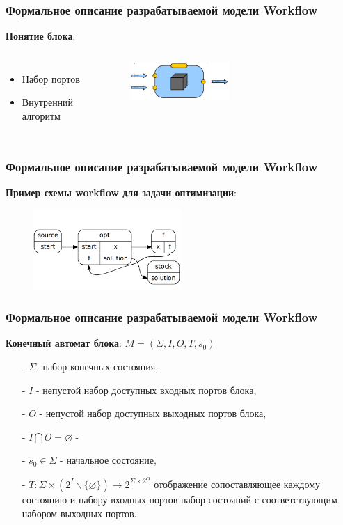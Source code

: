 \documentclass[10pt,pdf,hyperref={unicode}]{beamer}
\begin{document}
\begin{frame}
\frametitle{Формальное описание разрабатываемой модели Workflow}

\textbf{Понятие блока}:
 \begin{columns}
\begin{itemize}
\item<1-> Набор портов
\item<1-> Внутренний алгоритм

\end{itemize}    
\begin{figure}[here]
    \centering
    \includegraphics[width=0.5\textwidth]{block.png}
\end{figure}    
\end{columns}
\end{frame}


\begin{frame}
\frametitle{Формальное описание разрабатываемой модели Workflow}

\textbf{Пример схемы workflow для задачи оптимизации}:
\begin{figure}[here]
    \centering
    \includegraphics[width=0.5\textwidth]{optimization_workflow.png}
\end{figure}   
\end{frame}


\begin{frame}
\frametitle{Формальное описание разрабатываемой модели Workflow}

\textbf{Конечный автомат блока}:
 $M = (\Sigma, I, O, T, s_{0})$ 
\begin{enumerate}
\item[-] $\Sigma$ -набор конечных состояния,
\item[-] $I$ - непустой набор доступных входных портов блока,
\item[-] $O$ - непустой набор доступных выходных портов блока,
\item[-] $I \bigcap O = \varnothing$ - 
\item[-] $s_{0} \in \Sigma$ - начальное состояние,
\item[-] $T: \Sigma \times (2^{I} \backslash \lbrace \varnothing \rbrace) \rightarrow  2^{\Sigma \times 2^{O}}$ отображение сопоставляющее каждому состоянию и набору входных портов набор состояний с соответствующим набором выходных портов.
\end{enumerate}  
\end{frame}
\end{document}
